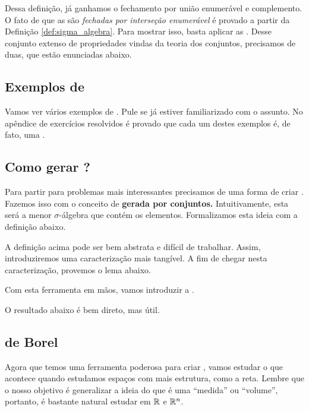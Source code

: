 \sigmaAlgebra

Dessa definição, já ganhamos o fechamento por união enumerável e complemento. O fato de que as \sigmaAlgs são \textit{fechadas por interseção enumerável} é provado a partir da Definição \ref{def:sigma_algebra}. Para mostrar isso, basta aplicar as . Desse conjunto extenso de propriedades vindas da teoria dos conjuntos, precisamos de duas, que estão enunciadas abaixo.

\deMorgan

\sigmaAlgebraIntersection

\subsection*{Exemplos de \sigmaAlgs}
Vamos ver vários exemplos de \sigmaAlgs. Pule se já estiver familiarizado com o assunto. No apêndice de exercícios resolvidos é provado que cada um destes exemplos é, de fato, uma \sigmaAlg.

\trivialSigmaAlgebra
\powerSetSigmaAlgebra
\countableSetsSigmaAlgebra

\subsection{Como gerar \sigmaAlgs?}
Para partir para problemas mais interessantes precisamos de uma forma de criar \sigmaAlgs. Fazemos isso com o conceito de \textbf{\sigmaAlg gerada por conjuntos.} Intuitivamente, esta será a menor $\sigma$-álgebra que contém os elementos. Formalizamos esta ideia com a definição abaixo.

\generatedSigmaAlgebra

A definição acima pode ser bem abstrata e difícil de trabalhar. Assim, introduziremos uma caracterização mais tangível. A fim de chegar nesta caracterização, provemos o lema abaixo.

\generatedSigmaAlgebraIsUnique

Com esta ferramenta em mãos, vamos introduzir a .

\generatedSigmaAlgebraCharacterization

O resultado abaixo é bem direto, mas útil.

\sigmaAlgebraGeneratedBySubset

\subsection{\sigmaAlgs de Borel}
Agora que temos uma ferramenta poderosa para criar \sigmaAlgs, vamos estudar o que acontece quando estudamos espaços com mais estrutura, como a reta. Lembre que o nosso objetivo é generalizar a ideia do que é uma ``medida'' ou ``volume'', portanto, é bastante natural estudar \sigmaAlgs em $\mathbb{R}$ e $\mathbb{R}^n$.


